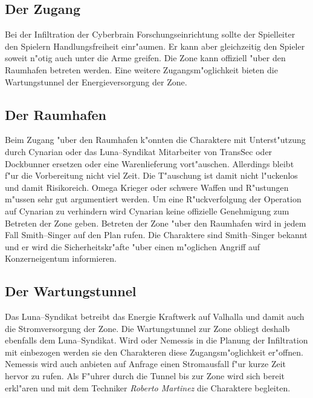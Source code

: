 \subsection{Der Zugang} 
Bei der Infiltration der Cyberbrain Forschungseinrichtung sollte der Spielleiter den Spielern Handlungsfreiheit einr"aumen. Er kann aber gleichzeitig den Spieler soweit n"otig auch unter die Arme greifen. Die Zone kann offiziell "uber den Raumhafen betreten werden. Eine weitere Zugangsm"oglichkeit bieten die Wartungstunnel der Energieversorgung der Zone.

\subsection{Der Raumhafen} 
Beim Zugang "uber den Raumhafen k"onnten die Charaktere mit Unterst"utzung durch Cynarian oder das Luna--Syndikat Mitarbeiter von TransSec oder Dockbunner ersetzen oder eine Warenlieferung vort"auschen. Allerdings bleibt f"ur die Vorbereitung nicht viel Zeit. Die T"auschung ist damit nicht l"uckenlos und damit Risikoreich. Omega Krieger oder schwere Waffen und R"ustungen m"ussen sehr gut argumentiert werden. Um eine R"uckverfolgung der Operation auf Cynarian zu verhindern wird Cynarian keine offizielle Genehmigung zum Betreten der Zone geben. Betreten der Zone "uber den Raumhafen wird in jedem Fall Smith--Singer auf den Plan rufen. Die Charaktere sind Smith--Singer bekannt und er wird die Sicherheitskr"afte "uber einen m"oglichen Angriff auf Konzerneigentum informieren. 

\subsection{Der Wartungstunnel} 
Das Luna--Syndikat betreibt das Energie Kraftwerk auf Valhalla und damit auch die Stromversorgung der Zone. Die Wartungstunnel zur Zone obliegt deshalb ebenfalls dem Luna--Syndikat. Wird \xl{} oder Nemessis in die Planung der Infiltration mit einbezogen werden sie den Charakteren diese Zugangsm"oglichkeit er"offnen. Nemessis wird auch anbieten auf Anfrage einen Stromausfall f"ur kurze Zeit hervor zu rufen. Als F"uhrer durch die Tunnel bis zur Zone wird sich \xl{} bereit erkl"aren und mit dem Techniker \emph{Roberto Martinez} die Charaktere begleiten.


